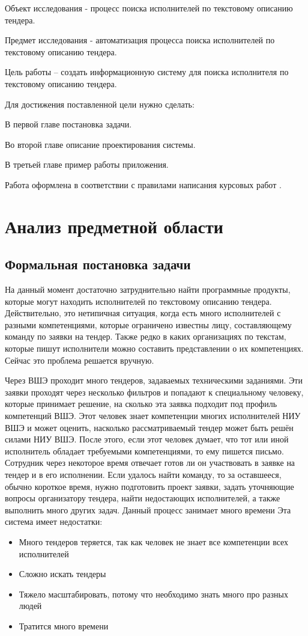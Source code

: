 \documentclass[PI,KR]{HSEUniversity}
\begin{document}
Объект исследования - процесс поиска исполнителей по текстовому описанию тендера.

Предмет исследования - автоматизация процесса поиска исполнителей по текстовому описанию тендера.

Цель работы – создать информационную систему для поиска исполнителя по текстовому описанию тендера.

Для достижения поставленной цели нужно сделать:

В первой главе постановка задачи.

Во второй главе описание проектирования системы.

В третьей главе пример работы приложения.

Работа оформлена в соответствии с правилами написания курсовых работ \cite{HSEDocuments}.
\chapter{Анализ предметной области}
\section{Формальная постановка задачи}
На данный момент достаточно затруднительно найти программные продукты, которые могут находить исполнителей по текстовому описанию тендера. Действительно, это нетипичная ситуация, когда есть много исполнителей с разными компетенциями, которые ограничено известны лицу, составляющему команду по заявки на тендер. Также редко в каких организациях по текстам, которые пишут исполнители можно составить представлении о их компетенциях. Сейчас это проблема решается вручную.


Через ВШЭ проходит много тендеров, задаваемых техническими заданиями. Эти заявки проходят через несколько фильтров и попадают к специальному человеку, которые принимает решение, на сколько эта заявка подходит под профиль компетенций ВШЭ. Этот человек знает компетенции многих исполнителей НИУ ВШЭ и может оценить, насколько рассматриваемый тендер может быть решён силами НИУ ВШЭ. После этого, если этот человек думает, что тот или иной исполнитель обладает требуемыми компетенциями, то ему пишется письмо. Сотрудник через некоторое время отвечает готов ли он участвовать в заявке на тендер и в его исполнении. Если удалось найти команду, то за оставшееся, обычно короткое время, нужно подготовить проект заявки, задать уточняющие вопросы организатору тендера, найти недостающих исполнителей, а также выполнить много других задач. Данный процесс занимает много времени Эта система имеет недостатки:
\begin{itemize}
	\item Много тендеров теряется, так как человек не знает все компетенции всех исполнителей
	\item Сложно искать тендеры
	\item Тяжело масштабировать, потому что необходимо знать много про разных людей
	\item Тратится много времени
\end{itemize}
\end{document}
